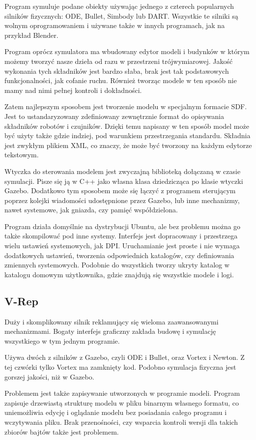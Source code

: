 Program symuluje podane obiekty używając jednego z czterech popularnych silników fizycznych: ODE, Bullet, Simbody lub DART.
Wszystkie te silniki są wolnym oprogramowaniem i używane także w innych programach, jak na przykład Blender.

Program oprócz symulatora ma wbudowany edytor modeli i budynków w którym możemy tworzyć nasze dzieła od razu w przestrzeni trójwymiarowej.
Jakość wykonania tych składników jest bardzo słaba, brak jest tak podstawowych funkcjonalności, jak cofanie ruchu.
Również tworząc modele w ten sposób nie mamy nad nimi pełnej kontroli i dokładności.

Zatem najlepszym sposobem jest tworzenie modelu w specjalnym formacie SDF. Jest to ustandaryzowany zdefiniowany zewnętrznie format do opisywania składników robotów i czujników.
Dzięki temu napisany w ten sposób model może być użyty także gdzie indziej, pod warunkiem przestrzegania standardu.
Składnia jest zwykłym plikiem XML, co znaczy, że może być tworzony na każdym edytorze tekstowym.

Wtyczka do sterowania modelem jest zwyczajną biblioteką dołączaną w czasie symulacji. 
Pisze się ją w C++ jako własna klasa dziedzicząca po klasie wtyczki Gazebo.
Dodatkowo tym sposobem może się łączyć z programem sterującym poprzez kolejki wiadomości udostępnione przez Gazebo, lub inne mechanizmy, nawet systemowe, jak gniazda, czy pamięć współdzielona.

Program działa domyślnie na dystrybucji Ubuntu, ale bez problemu można go także skompilować pod inne systemy.
Interfejs jest dopracowany i przestrzega wielu ustawień systemowych, jak DPI.
Uruchamianie jest proste i nie wymaga dodatkowych ustawień, tworzenia odpowiednich katalogów, czy definiowania zmiennych systemowych.
Podobnie do wszystkich tworzy ukryty katalog w katalogu domowym użytkownika, gdzie znajdują się wszystkie modele i logi.

\subsection{V-Rep}
Duży i skomplikowany silnik reklamujący się wieloma zaawansowanymi mechanizmami.
Bogaty interfejs graficzny zakłada budowę i symulację wszystkiego w tym jednym programie.

Używa dwóch z silników z Gazebo, czyli ODE i Bullet, oraz Vortex i Newton. Z tej czwórki tylko Vortex ma zamknięty kod.
Podobno symulacja fizyczna jest gorszej jakości, niż w Gazebo.

Problemem jest także zapisywanie utworzonych w programie modeli.
Program zapisuje drzewiastą strukturę modelu w pliku binarnym własnego formatu, co uniemożliwia edycję i oglądanie modelu bez posiadania całego programu i wczytywania pliku.
Brak przenośności, czy wsparcia kontroli wersji dla takich zbiorów bajtów także jest problemem.

